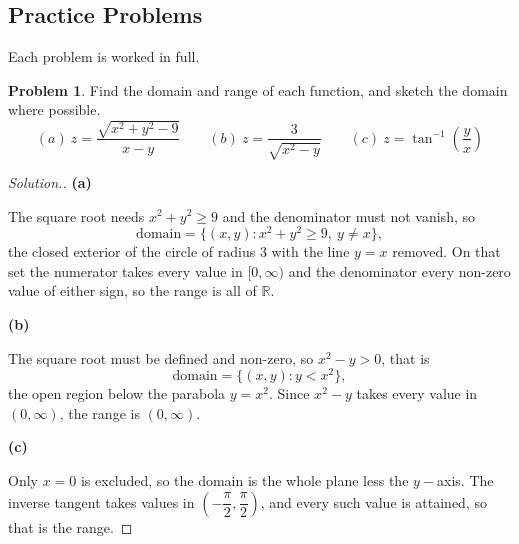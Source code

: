 \documentclass[11pt,a4paper]{article}
\theoremstyle{definition}
\newtheorem{problemx}{Problem}[subsection]
\newenvironment{problem}{\begin{problemx}}{\end{problemx}}
\newenvironment{solution}
  {\renewcommand{\qedsymbol}{}\begin{proof}[\textit{Solution}.]}
  {\end{proof}}
\newcommand{\subhead}[1]{%
  \par\medskip\noindent\textbf{#1}\par\nobreak\smallskip}
\begin{document}
\subsection{Practice Problems}

Each problem is worked in full.

\begin{problem}
Find the domain and range of each function, and sketch the domain where
possible.
\[(a)\ z = \frac{\sqrt{x^2+y^2-9}}{x-y}\qquad 
(b)\ z = \frac{3}{\sqrt{x^2-y}}\qquad 
(c)\ z = \tan^{-1}\left(\frac{y}{x}\right)\]
\end{problem}
\begin{solution}
\subhead{(a)}
The square root needs $x^2+y^2\geq 9$ and the denominator must not vanish, so
\[\text{domain} = \{(x,y): x^2+y^2\geq 9,\ y\neq x\},\]
the closed exterior of the circle of radius $3$ with the line $y=x$ removed. On
that set the numerator takes every value in $[0,\infty)$ and the denominator
every non-zero value of either sign, so the range is all of $\mathbb{R}$.

\subhead{(b)}
The square root must be defined and non-zero, so $x^2-y>0$, that is
\[\text{domain} = \{(x,y): y < x^2\},\]
the open region below the parabola $y = x^2$. Since $x^2-y$ takes every value in
$(0,\infty)$, the range is $(0,\infty)$.

\subhead{(c)}
Only $x=0$ is excluded, so the domain is the whole plane less the $y-$axis. The
inverse tangent takes values in $\left(-\dfrac{\pi}{2}, \dfrac{\pi}{2}\right)$, and
every such value is attained, so that is the range.
\end{solution}
\end{document}
